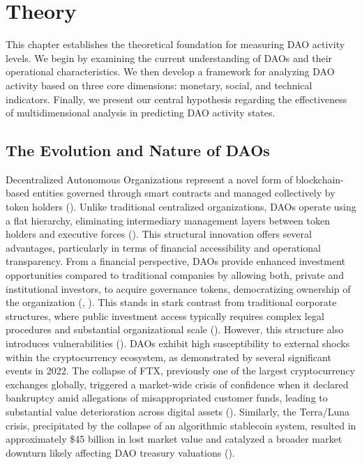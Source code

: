 \chapter{Theory}
This chapter establishes the theoretical foundation for measuring DAO activity levels. We begin by examining the current understanding of DAOs and their operational characteristics. We then develop a framework for analyzing DAO activity based on three core dimensions: monetary, social, and technical indicators. Finally, we present our central hypothesis regarding the effectiveness of multidimensional analysis in predicting DAO activity states.

\section{The Evolution and Nature of DAOs}
Decentralized Autonomous Organizations represent a novel form of blockchain-based entities governed through smart contracts and managed collectively by token holders (\cite{morrison2020dao}). Unlike traditional centralized organizations, DAOs operate using a flat hierarchy, eliminating intermediary management layers between token holders and executive forces (\cite{axelsen2024you}). This structural innovation offers several advantages, particularly in terms of financial accessibility and operational transparency.
From a financial perspective, DAOs provide enhanced investment opportunities compared to traditional companies by allowing both, private and institutional investors, to acquire governance tokens, democratizing ownership of the organization (\cite{hashemi2020icos}, \cite{blemus2020initial}). This stands in stark contrast from traditional corporate structures, where public investment access typically requires complex legal procedures and substantial organizational scale (\cite{boot2006entrepreneur}).
However, this structure also introduces vulnerabilities (\cite{han2025review}). DAOs exhibit high susceptibility to external shocks within the cryptocurrency ecosystem, as demonstrated by several significant events in 2022. The collapse of FTX, previously one of the largest cryptocurrency exchanges globally, triggered a market-wide crisis of confidence when it declared bankruptcy amid allegations of misappropriated customer funds, leading to substantial value deterioration across digital assets (\cite{akyildirim2023understanding}). Similarly, the Terra/Luna crisis, precipitated by the collapse of an algorithmic stablecoin system, resulted in approximately \$45 billion in lost market value and catalyzed a broader market downturn likely affecting DAO treasury valuations (\cite{briola2023anatomy}).
